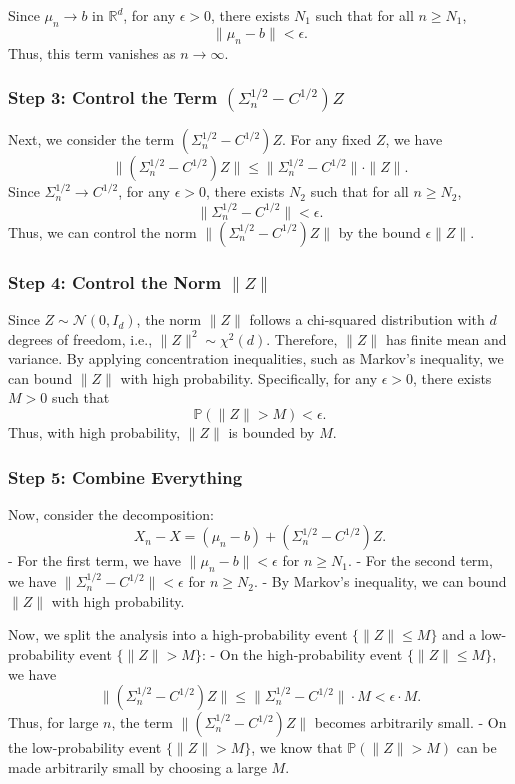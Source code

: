 \documentclass{article}
\begin{document}
Since \( \mu_n \to b \) in \( \mathbb{R}^d \), for any \( \epsilon > 0 \), there exists \( N_1 \) such that for all \( n \geq N_1 \),
\[
\| \mu_n - b \| < \epsilon.
\]
Thus, this term vanishes as \( n \to \infty \).

\subsubsection*{Step 3: Control the Term \( (\Sigma_n^{1/2} - C^{1/2}) Z \)}

Next, we consider the term \( (\Sigma_n^{1/2} - C^{1/2}) Z \). For any fixed \( Z \), we have
\[
\| (\Sigma_n^{1/2} - C^{1/2}) Z \| \leq \| \Sigma_n^{1/2} - C^{1/2} \| \cdot \| Z \|.
\]
Since \( \Sigma_n^{1/2} \to C^{1/2} \), for any \( \epsilon > 0 \), there exists \( N_2 \) such that for all \( n \geq N_2 \),
\[
\| \Sigma_n^{1/2} - C^{1/2} \| < \epsilon.
\]
Thus, we can control the norm \( \| (\Sigma_n^{1/2} - C^{1/2}) Z \| \) by the bound \( \epsilon \| Z \| \).

\subsubsection*{Step 4: Control the Norm \( \|Z\| \)}

Since \( Z \sim \mathcal{N}(0, I_d) \), the norm \( \|Z\| \) follows a chi-squared distribution with \( d \) degrees of freedom, i.e., \( \|Z\|^2 \sim \chi^2(d) \). Therefore, \( \|Z\| \) has finite mean and variance. By applying concentration inequalities, such as Markov's inequality, we can bound \( \|Z\| \) with high probability. Specifically, for any \( \epsilon > 0 \), there exists \( M > 0 \) such that
\[
\mathbb{P}(\|Z\| > M) < \epsilon.
\]
Thus, with high probability, \( \|Z\| \) is bounded by \( M \).

\subsubsection*{Step 5: Combine Everything}

Now, consider the decomposition:
\[
X_n - X = (\mu_n - b) + (\Sigma_n^{1/2} - C^{1/2}) Z.
\]
- For the first term, we have \( \| \mu_n - b \| < \epsilon \) for \( n \geq N_1 \).
- For the second term, we have \( \| \Sigma_n^{1/2} - C^{1/2} \| < \epsilon \) for \( n \geq N_2 \).
- By Markov's inequality, we can bound \( \|Z\| \) with high probability.

Now, we split the analysis into a high-probability event \( \{ \|Z\| \leq M \} \) and a low-probability event \( \{ \|Z\| > M \} \):
- On the high-probability event \( \{ \|Z\| \leq M \} \), we have
\[
\| (\Sigma_n^{1/2} - C^{1/2}) Z \| \leq \| \Sigma_n^{1/2} - C^{1/2} \| \cdot M < \epsilon \cdot M.
\]
Thus, for large \( n \), the term \( \| (\Sigma_n^{1/2} - C^{1/2}) Z \| \) becomes arbitrarily small.
- On the low-probability event \( \{ \|Z\| > M \} \), we know that \( \mathbb{P}(\|Z\| > M) \) can be made arbitrarily small by choosing a large \( M \).
\end{document}
